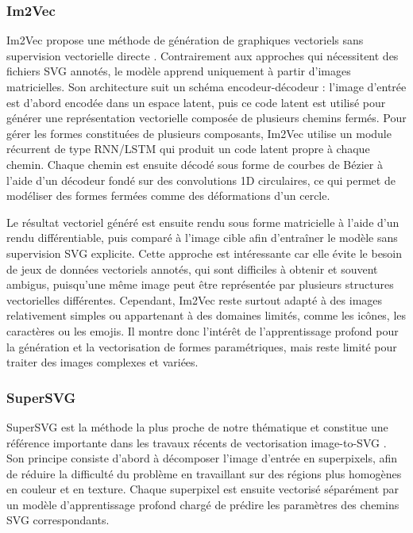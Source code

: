 \documentclass[12pt, a4paper, oneside]{report}
\begin{document}
        \subsubsection{Im2Vec}
Im2Vec propose une méthode de génération de graphiques vectoriels sans supervision vectorielle directe \cite{reddy2021im2vec}. Contrairement aux approches qui nécessitent des fichiers SVG annotés, le modèle apprend uniquement à partir d'images matricielles. Son architecture suit un schéma encodeur-décodeur : l'image d'entrée est d'abord encodée dans un espace latent, puis ce code latent est utilisé pour générer une représentation vectorielle composée de plusieurs chemins fermés. Pour gérer les formes constituées de plusieurs composants, Im2Vec utilise un module récurrent de type RNN/LSTM qui produit un code latent propre à chaque chemin. Chaque chemin est ensuite décodé sous forme de courbes de Bézier à l'aide d'un décodeur fondé sur des convolutions 1D circulaires, ce qui permet de modéliser des formes fermées comme des déformations d'un cercle.

Le résultat vectoriel généré est ensuite rendu sous forme matricielle à l'aide d'un rendu différentiable, puis comparé à l'image cible afin d'entraîner le modèle sans supervision SVG explicite. Cette approche est intéressante car elle évite le besoin de jeux de données vectoriels annotés, qui sont difficiles à obtenir et souvent ambigus, puisqu'une même image peut être représentée par plusieurs structures vectorielles différentes. Cependant, Im2Vec reste surtout adapté à des images relativement simples ou appartenant à des domaines limités, comme les icônes, les caractères ou les emojis. Il montre donc l'intérêt de l'apprentissage profond pour la génération et la vectorisation de formes paramétriques, mais reste limité pour traiter des images complexes et variées.

        \subsubsection{SuperSVG}
SuperSVG est la méthode la plus proche de notre thématique et constitue une référence importante dans les travaux récents de vectorisation image-to-SVG \cite{hu2024supersvg}. Son principe consiste d'abord à décomposer l'image d'entrée en superpixels, afin de réduire la difficulté du problème en travaillant sur des régions plus homogènes en couleur et en texture. Chaque superpixel est ensuite vectorisé séparément par un modèle d'apprentissage profond chargé de prédire les paramètres des chemins SVG correspondants.
\end{document}
